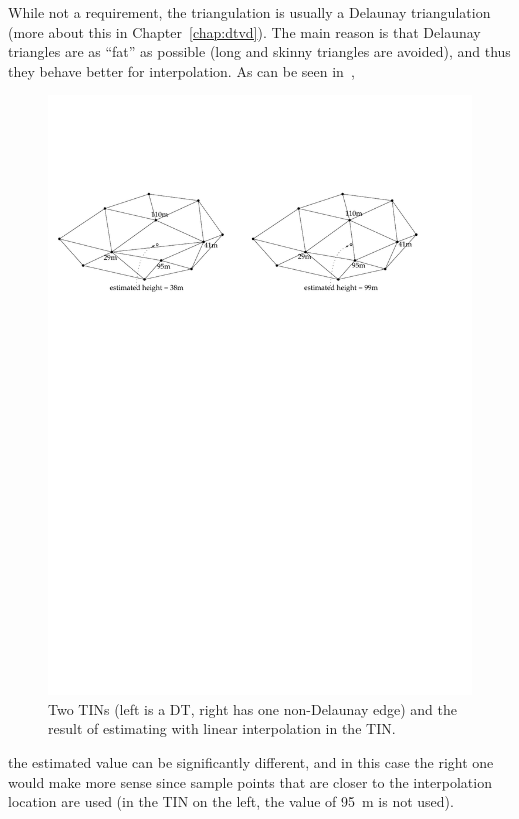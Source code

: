 While not a requirement, the triangulation is usually a Delaunay triangulation (more about this in Chapter~\ref{chap:dtvd}).
The main reason is that Delaunay triangles are as ``fat'' as possible (long and skinny triangles are avoided), and thus they behave better for interpolation.
As can be seen in~,
\begin{figure}
  \centering
  \includegraphics[width=\linewidth]{figs/whydt}
  \caption{Two TINs (left is a DT, right has one non-Delaunay edge) and the result of estimating with linear interpolation in the TIN\@.}%
\end{figure}
the estimated value can be significantly different, and in this case the right one would make more sense since sample points that are closer to the interpolation location are used (in the TIN on the left, the value of \SI{95}{\m} is not used).

